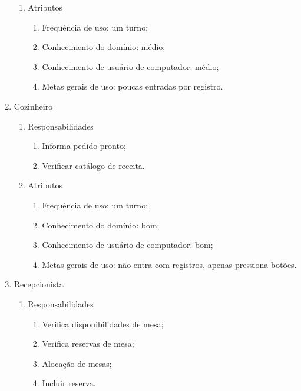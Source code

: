 \begin{enumerate}
\begin{enumerate}
    \item Atributos

      \begin{enumerate}
          \item Frequência de uso: um turno;
          \item Conhecimento do domínio: médio;
          \item Conhecimento de usuário de computador: médio;
          \item Metas gerais de uso: poucas entradas por registro.
      \end{enumerate}
  \end{enumerate}


  \item Cozinheiro

  \begin{enumerate}
    \item Responsabilidades

      \begin{enumerate}
          \item Informa pedido pronto;
          \item Verificar catálogo de receita.

      \end{enumerate}

    \item Atributos

      \begin{enumerate}
          \item Frequência de uso: um turno;
          \item Conhecimento do domínio: bom;
          \item Conhecimento de usuário de computador: bom;
          \item Metas gerais de uso: não entra com registros, apenas pressiona botões.
      \end{enumerate}
  \end{enumerate}

  \item Recepcionista

  \begin{enumerate}
    \item Responsabilidades

      \begin{enumerate}
          \item Verifica disponibilidades de mesa;
          \item Verifica reservas de mesa;
          \item Alocação de mesas;
          \item Incluir reserva.
      \end{enumerate}


\end{enumerate}
\end{enumerate}
